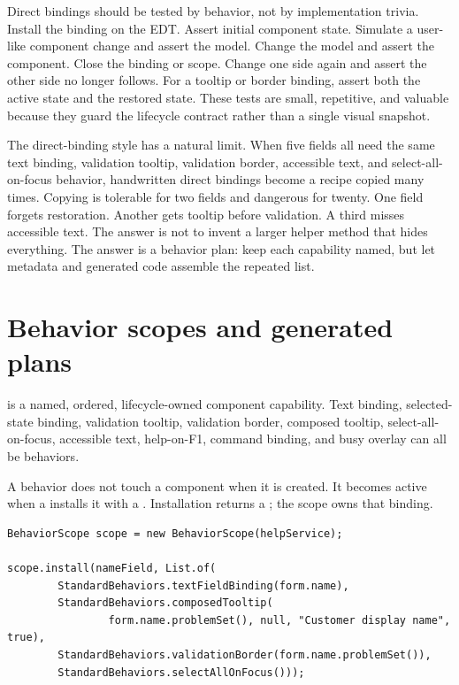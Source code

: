 Direct bindings should be tested by behavior, not by implementation trivia.
Install the binding on the EDT. Assert initial component state. Simulate a
user-like component change and assert the model. Change the model and assert
the component. Close the binding or scope. Change one side again and assert the
other side no longer follows. For a tooltip or border binding, assert both the
active state and the restored state. These tests are small, repetitive, and
valuable because they guard the lifecycle contract rather than a single visual
snapshot.

The direct-binding style has a natural limit. When five fields all need the
same text binding, validation tooltip, validation border, accessible text, and
select-all-on-focus behavior, handwritten direct bindings become a recipe
copied many times. Copying is tolerable for two fields and dangerous for
twenty. One field forgets restoration. Another gets tooltip before validation.
A third misses accessible text. The answer is not to invent a larger helper
method that hides everything. The answer is a behavior plan: keep each
capability named, but let metadata and generated code assemble the repeated
list.

\section{Behavior scopes and generated plans}

 is a named, ordered, lifecycle-owned
component capability. Text binding, selected-state binding, validation tooltip,
validation border, composed tooltip, select-all-on-focus, accessible text,
help-on-F1, command binding, and busy overlay can all be behaviors.

A behavior does not touch a component when it is created. It becomes active when
a  installs it with a . Installation
returns a ; the scope owns that binding.

\begin{lstlisting}[caption={Installing behaviors rather than individual bindings.}]
BehaviorScope scope = new BehaviorScope(helpService);

scope.install(nameField, List.of(
        StandardBehaviors.textFieldBinding(form.name),
        StandardBehaviors.composedTooltip(
                form.name.problemSet(), null, "Customer display name", true),
        StandardBehaviors.validationBorder(form.name.problemSet()),
        StandardBehaviors.selectAllOnFocus()));
\end{lstlisting}

